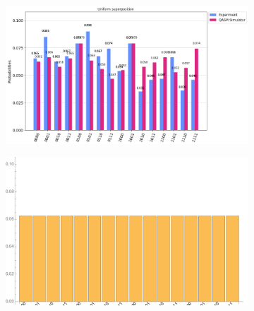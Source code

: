 \documentclass[10pt]{amsart}
\theoremstyle{definition}
\begin{document}
\begin{figure}[hbt]
    \begin{subfigure}{0.4\textwidth}
    \centering
    \includegraphics[width=0.9\linewidth]{smallt_inputUnif_quantum.png}
  \end{subfigure}
  \begin{subfigure}{0.4\textwidth}
    \centering
    \includegraphics[width=0.9\linewidth]{smallt_inputUnif_exact.pdf}
  \end{subfigure}
  

\end{figure}
\end{document}
